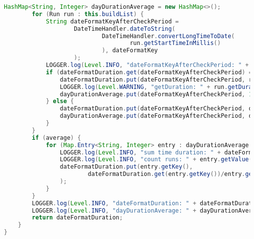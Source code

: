 \begin{lstlisting}[language=Java]
        HashMap<String, Integer> dayDurationAverage = new HashMap<>();
        for (Run run : this.buildList) {
            String dateFormatKeyAfterCheckPeriod =
                    DateTimeHandler.dateToString(
                            DateTimeHandler.convertLongTimeToDate(
                                    run.getStartTimeInMillis()
                            ), dateFormatKey
                    );
            LOGGER.log(Level.INFO, "dateFormatKeyAfterCheckPeriod: " + dateFormatKeyAfterCheckPeriod);
            if (dateFormatDuration.get(dateFormatKeyAfterCheckPeriod) == 0.0) {
                dateFormatDuration.put(dateFormatKeyAfterCheckPeriod, run.getDuration() / 1000.0);
                LOGGER.log(Level.WARNING, "getDuration: " + run.getDuration());
                dayDurationAverage.put(dateFormatKeyAfterCheckPeriod, 1);
            } else {
                dateFormatDuration.put(dateFormatKeyAfterCheckPeriod, dateFormatDuration.get(dateFormatKeyAfterCheckPeriod) + run.getDuration() / 1000.0);
                dayDurationAverage.put(dateFormatKeyAfterCheckPeriod, dayDurationAverage.get(dateFormatKeyAfterCheckPeriod) + 1);
            }
        }
        if (average) {
            for (Map.Entry<String, Integer> entry : dayDurationAverage.entrySet()) {
                LOGGER.log(Level.INFO, "sum time duration: " + dateFormatDuration.get(entry.getKey()));
                LOGGER.log(Level.INFO, "count runs: " + entry.getValue());
                dateFormatDuration.put(entry.getKey(),
                        dateFormatDuration.get(entry.getKey())/entry.getValue()
                );
            }
        }
        LOGGER.log(Level.INFO, "dateFormatDuration: " + dateFormatDuration);
        LOGGER.log(Level.INFO, "dayDurationAverage: " + dayDurationAverage);
        return dateFormatDuration;
    }
}



\end{lstlisting}

